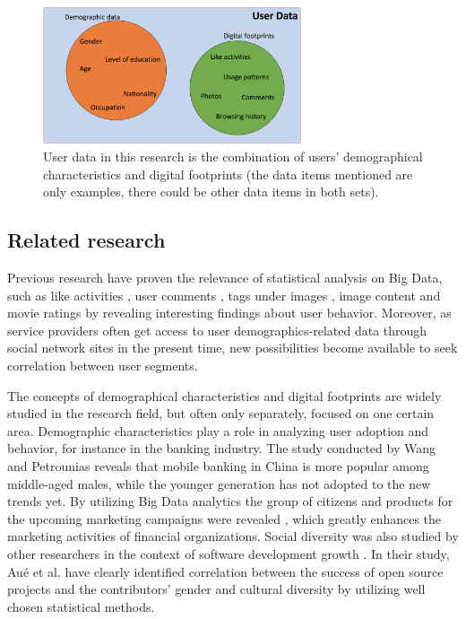 \begin{figure}[h] 
  \begin{center}
    \includegraphics[width=3in]{Images/user_data_venn.png}
    \caption{User data in this research is the combination of users' demographical characteristics and digital footprints (the data items mentioned are only examples, there could be other data items in both sets).}
    \label{user_data_venn}
  \end{center}
\end{figure}

\subsection{Related research}
Previous research have proven the relevance of statistical analysis on Big Data, such as like activities \cite{jang2015noreciprocity, jang2016teensengagemorewithfewerphotos, ottoni2013ladies, guy2016whatsyourorganizationlike, jang2015no}, user comments \cite{jang2016teensengagemorewithfewerphotos}, tags under images \cite{jang2016teensengagemorewithfewerphotos}, image content \cite{hu2014we, bakhshi2014faces} and movie ratings \cite{saraee2004data, kabinsingha2012movie} by revealing interesting findings about user behavior. Moreover, as service providers often get access to user demographics-related data through social network sites in the present time, new possibilities become available to seek correlation between user segments. 

The concepts of demographical characteristics and digital footprints are widely studied in the research field, but often only separately, focused on one certain area. Demographic characteristics play a role in analyzing user adoption and behavior, for instance in the banking industry. The study conducted by Wang and Petrounias \cite{chinesemobilebankingusers} reveals that mobile banking in China is more popular among middle-aged males, while the younger generation has not adopted to the new trends yet. By utilizing Big Data analytics the group of citizens and products for the upcoming marketing campaigns were revealed \cite{chinesemobilebankingusers}, which greatly enhances the marketing activities of financial organizations. Social diversity was also studied by other researchers in the context of software development growth \cite{socialdiversityongithub}. In their study, Aué et al. \cite{socialdiversityongithub} have clearly identified correlation between the success of open source projects and the contributors' gender and cultural diversity by utilizing well chosen statistical methods. 

